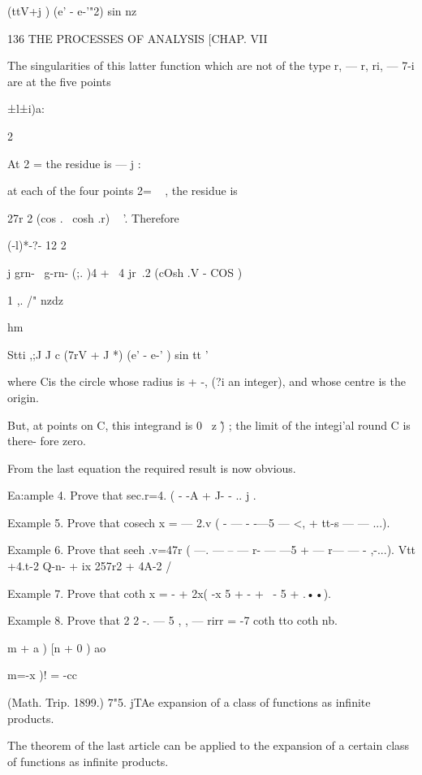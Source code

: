 (ttV+j ) (e'  - e-'"2) sin nz 



136 THE PROCESSES OF ANALYSIS [CHAP. VII 

The singularities of this latter function which are not of the type r, — r, ri, — 7-i are 
at the five points 

 ±l±i)a: 

2 

At 2 = the residue is — j : 

at each of the four points 2= ~ , the residue is 

 27r 2 (cos  . \  cosh .r)  ~ '. 
Therefore 

  (-l)*-?- 12 2 



 j grn- \  g-rn- (;. )4 +  \  4   jr\  .2 (cOsh .V - COS  ) 



1 ,. /" nzdz 

hm 



Stti ,;J  J c (7rV + J *) (e'  - e-' ) sin tt  ' 

where Cis the circle whose radius is   + -, (?i an integer), and whose centre is the origin. 

But, at points on C, this integrand is 0 \ z \~ ) ; the limit of the integi'al round C is there- 
fore zero. 

From the last equation the required result is now obvious. 

Ea:ample 4. Prove that sec.r=4. (  - -A  +  J- - .. j . 

Example 5. Prove that cosech x = — 2.v ( -  —   - -—5 — <, + tt-s —   — ...). 

Example 6. Prove that seeh .v=47r ( —. — --  —  r-  — —5 + — r—   — - ,-...). 
  Vtt +4.t-2 Q-n-  + ix  257r2 + 4A-2 / 

Example 7. Prove that coth x = - + 2x( -x 5 +  -   + \  -  5 + .••). 

Example 8. Prove that 2 2 -. — 5  , ,   — rirr = -7 coth tto coth nb. 

 m  + a ) [n  + 0 ) ao 



m=-x )! = -cc 



(Math. Trip. 1899.) 
7"5. jTAe expansion of a class of functions as infinite products. 

The theorem of the last article can be applied to the expansion of a certain 
class of functions as infinite products. 

